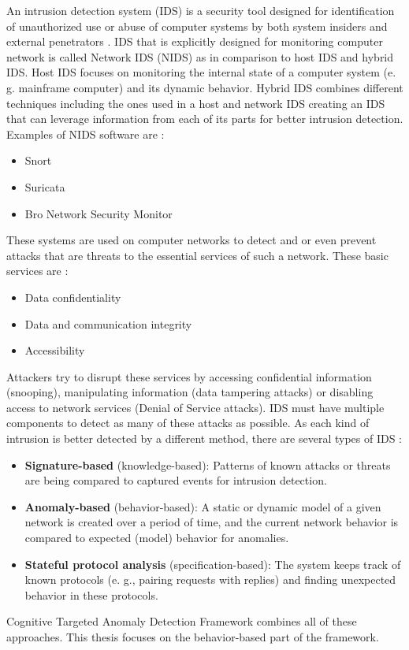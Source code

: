 \documentclass[thesis=B,english]{FITthesis}[2012/10/20]
\begin{document}
An intrusion detection system (IDS) is a security tool designed for identification of unauthorized use or abuse of computer systems by both system insiders and external penetrators \cite{mukherjee1994network}.
IDS that is explicitly designed for monitoring computer network is called Network IDS (NIDS) as in comparison to host IDS and hybrid IDS.
Host IDS focuses on monitoring the internal state of a computer system (e. g. mainframe computer) and its dynamic behavior.
Hybrid IDS combines different techniques including the ones used in a host and network IDS creating an IDS that can leverage information from each of its parts for better intrusion detection.
Examples of NIDS software are \cite{cooper2019bestids}:
\begin{itemize}
    \item Snort
    \item Suricata
    \item Bro Network Security Monitor
\end{itemize}
These systems are used on computer networks to detect and or even prevent attacks that are threats to the essential services of such a network.
These basic services are \cite{mukherjee1994network}:
\begin{itemize}
    \item Data confidentiality
    \item Data and communication integrity
    \item Accessibility
\end{itemize}
Attackers try to disrupt these services by accessing confidential information (snooping), manipulating information (data tampering attacks) or disabling access to network services (Denial of Service attacks).
IDS must have multiple components to detect as many of these attacks as possible.
As each kind of intrusion is better detected by a different method, there are several types of IDS \cite{liao2013intrusion}:
\begin{itemize}
    \item \textbf{Signature-based} (knowledge-based): Patterns of known attacks or threats are being compared to captured events for intrusion detection.
    \item \textbf{Anomaly-based} (behavior-based): A static or dynamic model of a given network is created over a period of time, and the current network behavior is compared to expected (model) behavior for anomalies.
    \item \textbf{Stateful protocol analysis} (specification-based): The system keeps track of known protocols (e. g., pairing requests with replies) and finding unexpected behavior in these protocols.
\end{itemize}
Cognitive Targeted Anomaly Detection Framework combines all of these approaches.
This thesis focuses on the behavior-based part of the framework.
\end{document}
